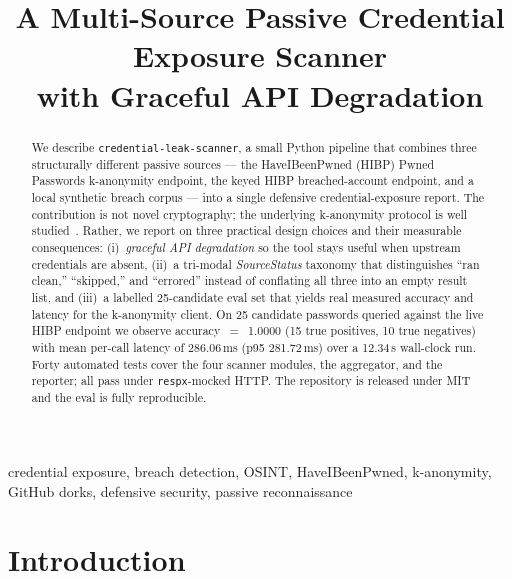 \documentclass[conference]{IEEEtran}
\begin{document}
\title{A Multi-Source Passive Credential Exposure Scanner\\with Graceful API Degradation}

\author{
}

\maketitle

\begin{abstract}
We describe \texttt{credential-leak-scanner}, a small Python pipeline that
combines three structurally different passive sources --- the
HaveIBeenPwned (HIBP) Pwned Passwords k-anonymity endpoint, the keyed
HIBP breached-account endpoint, and a local synthetic breach corpus ---
into a single defensive credential-exposure report. The contribution is
not novel cryptography; the underlying k-anonymity protocol is well
studied~\cite{li2019protocols,pal2022might}. Rather, we report on three
practical design choices and their measurable consequences:
(i)~\emph{graceful API degradation} so the tool stays useful when
upstream credentials are absent, (ii)~a tri-modal
\emph{SourceStatus} taxonomy that distinguishes ``ran clean,''
``skipped,'' and ``errored'' instead of conflating all three into an
empty result list, and (iii)~a labelled 25-candidate eval set that
yields real measured accuracy and latency for the k-anonymity client.
On 25 candidate passwords queried against the live HIBP endpoint we
observe accuracy~$=$~1.0000 (15 true positives, 10 true negatives) with
mean per-call latency of 286.06\,ms (p95 281.72\,ms) over a 12.34\,s
wall-clock run. Forty automated tests cover the four scanner modules,
the aggregator, and the reporter; all pass under \texttt{respx}-mocked
HTTP. The repository is released under MIT and the eval is fully
reproducible.
\end{abstract}

\begin{IEEEkeywords}
credential exposure, breach detection, OSINT, HaveIBeenPwned,
k-anonymity, GitHub dorks, defensive security, passive reconnaissance
\end{IEEEkeywords}

\section{Introduction}
\end{document}
